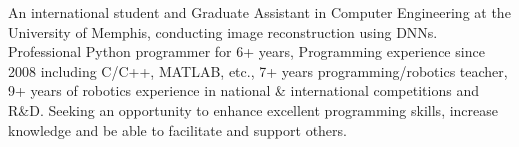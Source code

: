 
\begin{cvparagraph}
An international student and Graduate Assistant in Computer Engineering at the University of Memphis, conducting image reconstruction using DNNs. Professional Python programmer for 6+ years, Programming experience since 2008 including C/C++, MATLAB, etc., 7+ years programming/robotics teacher, 9+ years of robotics experience in national \& international competitions and R\&D. Seeking an opportunity to enhance excellent programming skills, increase knowledge and be able to facilitate and support others. 
\end{cvparagraph}